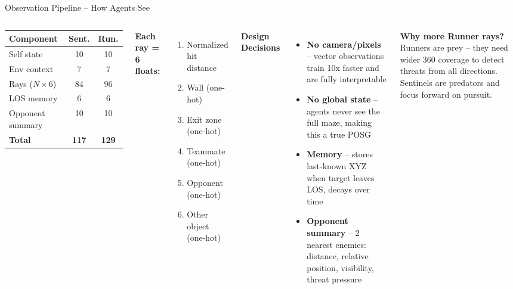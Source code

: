 \documentclass[aspectratio=169,11pt]{beamer}
\begin{document}
\begin{frame}{Observation Pipeline -- How Agents See}
\begin{columns}[T]
\begin{tabular}{@{}lcc@{}}
\toprule
\textbf{Component} & \textbf{Sent.} & \textbf{Run.} \\
\midrule
Self state & 10 & 10 \\
Env context & 7 & 7 \\
Rays ($N \times 6$) & 84 & 96 \\
LOS memory & 6 & 6 \\
Opponent summary & 10 & 10 \\
\midrule
\textbf{Total} & \textbf{117} & \textbf{129} \\
\bottomrule
\end{tabular}

\vspace{8pt}
\textbf{Each ray = 6 floats:}
\begin{enumerate}
\item Normalized hit distance
\item Wall (one-hot)
\item Exit zone (one-hot)
\item Teammate (one-hot)
\item Opponent (one-hot)
\item Other object (one-hot)
\end{enumerate}

\textbf{Design Decisions}
\begin{itemize}
\item \textbf{No camera/pixels} -- vector observations train 10x faster and are fully interpretable
\item \textbf{No global state} -- agents never see the full maze, making this a true POSG
\item \textbf{Memory} -- stores last-known XYZ when target leaves LOS, decays over time
\item \textbf{Opponent summary} -- 2 nearest enemies: distance, relative position, visibility, threat pressure
\end{itemize}

\vspace{6pt}
\textbf{Why more Runner rays?}\\
Runners are prey -- they need wider 360\textdegree{} coverage to detect threats from all directions. Sentinels are predators and focus forward on pursuit.
\end{columns}
\end{frame}
\end{document}
